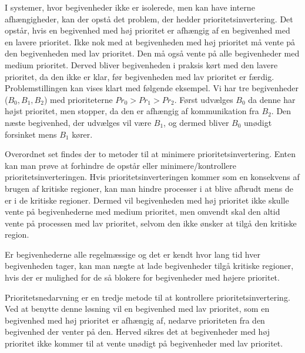 I systemer, hvor begivenheder ikke er isolerede, men kan have interne afhængigheder, kan der opstå det problem, der hedder prioritetsinvertering\cite{sha1990priority}. Det opstår, hvis en begivenhed med høj prioritet er afhængig af en begivenhed med en lavere prioritet. Ikke nok med at begivenheden med høj prioritet må vente på den  begivenheden med lav prioritet. Den må også vente på alle begivenheder med medium prioritet. Derved bliver begivenheden i praksis kørt med den lavere prioritet, da den ikke er klar, før begivenheden med lav prioritet er færdig. Problemstillingen kan vises klart med følgende eksempel. Vi har tre begivenheder ($B_0,B_1,B_2$) med prioriteterne $Pr_0>Pr_1>Pr_2$. Først udvælges $B_0$ da denne har højst prioritet, men stopper, da den er afhængig af kommunikation fra $B_2$. Den næste begivenhed, der udvælges vil være $B_1$, og dermed bliver $B_0$ unødigt forsinket mens $B_1$ kører.

Overordnet set findes der to metoder til at minimere prioritetsinvertering. Enten kan man prøve at forhindre de opstår eller minimere/kontrollere prioritetsinverteringen. 
Hvis prioritetsinverteringen kommer som en konsekvens af brugen af kritiske regioner, kan man hindre processer i at blive afbrudt mens de er i de kritiske regioner. Dermed vil begivenheden med høj prioritet ikke skulle vente på begivenhederne med medium prioritet, men omvendt skal den altid vente på processen med lav prioritet, selvom den ikke ønsker at tilgå den kritiske region. 

Er begivenhederne alle regelmæssige og det er kendt hvor lang tid hver begivenheden tager, kan man nægte at lade begivenheder tilgå kritiske regioner, hvis der er mulighed for de så blokere for begivenheder med højere prioritet.

Prioritetsnedarvning er en tredje metode til at kontrollere prioritetsinvertering\cite{sha1990priority}. Ved at benytte denne løsning vil en begivenhed med lav prioritet, som en begivenhed med høj prioritet er afhængig af, nedarve prioriteten fra den begivenhed der venter på den. Herved sikres det at begivenheder med høj prioritet ikke kommer til at vente unødigt på begivenheder med lav prioritet. 


